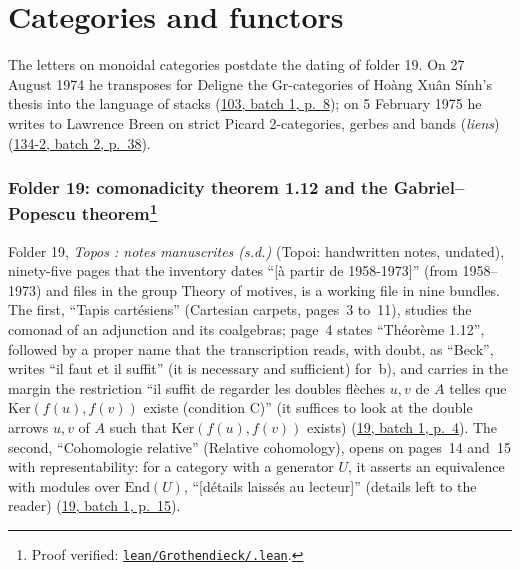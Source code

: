 \documentclass[11pt]{article}
\newcommand{\q}[1]{“#1”}
\newcommand{\lot}[3]{\href{https://grothendieck.commutator.io/\##1/#2/p#3}{#1, batch #2, p.~#3}}
\newcommand{\verifie}[1]{\footnote{Proof verified: \href{https://github.com/Commutator-IO/grothendieck-project/blob/article-lean-2026-10/lean/Grothendieck/#1.lean}{\texttt{lean/Grothendieck/\detokenize{#1}.lean}}.}}
\newcommand{\lettres}[1]{{\small #1\par}\medskip}
\theoremstyle{plain}
\theoremstyle{definition}
\theoremstyle{remark}
\begin{document}
\tableofcontents

\part{Categories and functors}
\lettres{The letters on monoidal categories postdate the dating of folder 19. On 27 August 1974 he transposes for Deligne the Gr-categories of Hoàng Xuân Sính's thesis into the language of stacks (\lot{103}{1}{8}); on 5 February 1975 he writes to Lawrence Breen on strict Picard 2-categories, gerbes and bands (\textit{liens}) (\lot{134-2}{2}{38}).}

\section[Folder 19: comonadicity theorem 1.12 and the Gabriel--Popescu theorem]{Folder 19: comonadicity theorem 1.12 and the Gabriel--Popescu theorem\protect\verifie{Folder19}}\label{sec:19}

Folder 19, \emph{Topos : notes manuscrites (s.d.)} (Topoi: handwritten notes, undated), ninety-five pages that the inventory dates \q{[à partir de 1958-1973]} (from 1958--1973) and files in the group Theory of motives, is a working file in nine bundles. The first, \q{Tapis cartésiens} (Cartesian carpets, pages~3 to~11), studies the comonad of an adjunction and its coalgebras; page~4 states \q{Théorème 1.12}, followed by a proper name that the transcription reads, with doubt, as \q{Beck}, writes \q{il faut et il suffit} (it is necessary and sufficient) for~b), and carries in the margin the restriction \q{il suffit de regarder les doubles flèches $u, v$ de $A$ telles que $\mathrm{Ker}(f(u), f(v))$ existe \quad (condition C)} (it suffices to look at the double arrows $u, v$ of $A$ such that $\mathrm{Ker}(f(u), f(v))$ exists) (\lot{19}{1}{4}). The second, \q{Cohomologie relative} (Relative cohomology), opens on pages~14 and~15 with representability: for a category with a generator $U$, it asserts an equivalence with modules over $\mathrm{End}(U)$, \q{[détails laissés au lecteur]} (details left to the reader) (\lot{19}{1}{15}).
\end{document}

